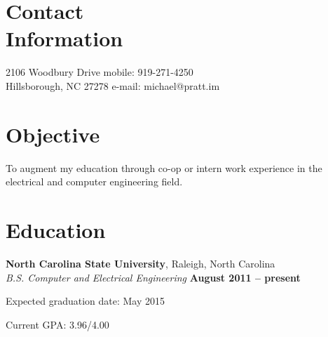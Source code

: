 \documentclass[margin,line,letterpaper]{resume}
\begin{document}
\begin{resume}

    \section{\mysidestyle Contact\\Information}

    2106 Woodbury Drive             \hfill mobile: 919-271-4250          \vspace{0mm}\\\vspace{0mm}%
    Hillsborough, NC 27278          \hfill e-mail: michael@pratt.im      \vspace{0mm}\\\vspace{-4.5mm}%


    \section{\mysidestyle Objective}

    To augment my education through co-op or intern work experience
    in the electrical and computer engineering field.


    \section{\mysidestyle Education}

    \textbf{North Carolina State University}, Raleigh, North Carolina \vspace{2mm}\\\vspace{1mm}%
    \textsl{B.S. Computer and Electrical Engineering} \hfill \textbf{ August 2011 -- present}\vspace{-3mm}\\\vspace{-1mm}%
    \begin{list2}
        \item Expected graduation date: May 2015
        \item Current GPA: 3.96/4.00
    \end{list2}\vspace{-1.5mm}



\end{resume}
\end{document}
